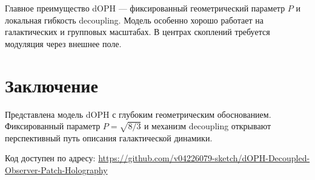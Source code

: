 \documentclass[12pt,a4paper]{article}
\begin{document}
Главное преимущество dOPH — фиксированный геометрический параметр \(P\) и локальная гибкость decoupling. Модель особенно хорошо работает на галактических и групповых масштабах. В центрах скоплений требуется модуляция через внешнее поле.

\section{Заключение}

Представлена модель dOPH с глубоким геометрическим обоснованием. Фиксированный параметр \(P = \sqrt{8/3}\) и механизм decoupling открывают перспективный путь описания галактической динамики.

Код доступен по адресу:  
\url{https://github.com/v04226079-sketch/dOPH-Decoupled-Observer-Patch-Holography}
\end{document}

